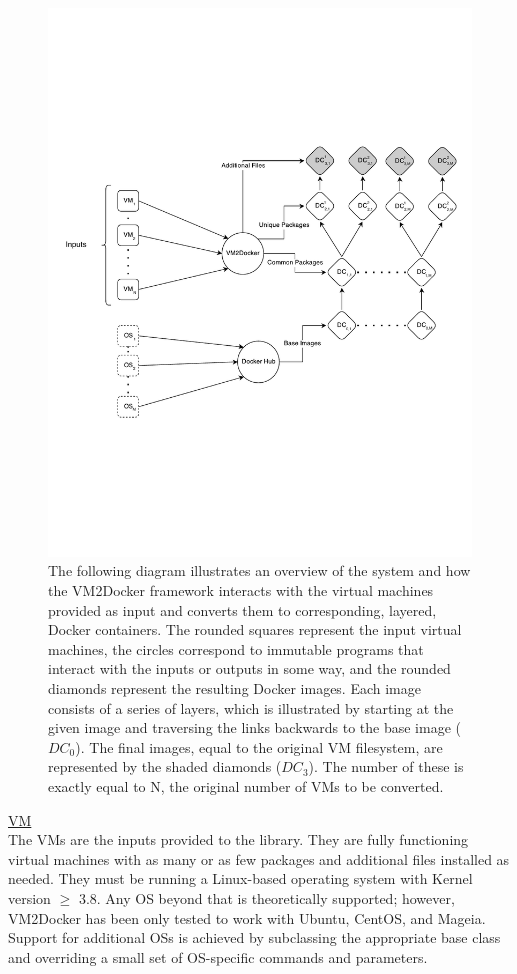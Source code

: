 \begin{figure}[h]
\centering
    \includegraphics[width=1.0\textwidth]{system.pdf}
    \caption{The following diagram illustrates an overview of the system and how the VM2Docker framework interacts with the virtual machines provided as input and converts them to corresponding, layered, Docker containers. The rounded squares represent the input virtual machines, the circles correspond to immutable programs that interact with the inputs or outputs in some way, and the rounded diamonds represent the resulting Docker images. Each image consists of a series of layers, which is illustrated by starting at the given image and traversing the links backwards to the base image ($DC_0$). The final images, equal to the original VM filesystem, are represented by the shaded diamonds ($DC_3$). The number of these is exactly equal to N, the original number of VMs to be converted.}
\end{figure}

\underline{VM}\\
The VMs are the inputs provided to the library. They are fully functioning virtual machines with as many or as few packages and additional files installed as needed. They must be running a Linux-based operating system with Kernel version $\ge$ 3.8. Any OS beyond that is theoretically supported; however, VM2Docker has been only tested to work with Ubuntu, CentOS, and Mageia. Support for additional OSs is achieved by subclassing the appropriate base class and overriding a small set of OS-specific commands and parameters.

